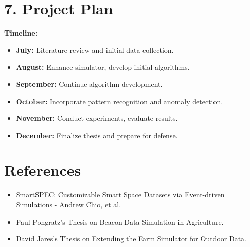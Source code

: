 \documentclass[12pt]{article}
\begin{document}
\section*{7. Project Plan}
\textbf{Timeline:}
\begin{itemize}
    \item \textbf{July:} Literature review and initial data collection.
    \item \textbf{August:} Enhance simulator, develop initial algorithms.
    \item \textbf{September:} Continue algorithm development.
    \item \textbf{October:} Incorporate pattern recognition and anomaly detection.
    \item \textbf{November:} Conduct experiments, evaluate results.
    \item \textbf{December:} Finalize thesis and prepare for defense.
\end{itemize}



\section*{References}
\begin{itemize}
    \item SmartSPEC: Customizable Smart Space Datasets via Event-driven Simulations - Andrew Chio, et al.
    \item Paul Pongratz's Thesis on Beacon Data Simulation in Agriculture.
    \item David Jares's Thesis on Extending the Farm Simulator for Outdoor Data.
\end{itemize}
\end{document}
